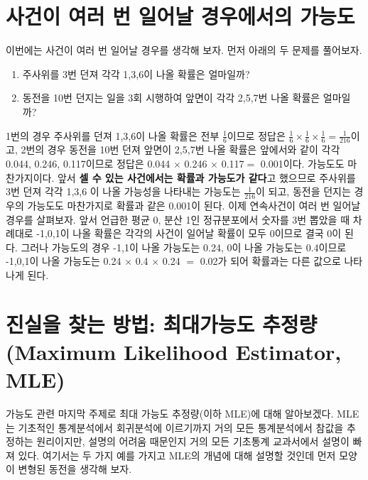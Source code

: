 \documentclass[]{book}
\providecommand{\tightlist}{%
  \setlength{\itemsep}{0pt}\setlength{\parskip}{0pt}}
\begin{document}
\section{사건이 여러 번 일어날 경우에서의
가능도}\label{uxc0acuxac74uxc774-uxc5ecuxb7ec-uxbc88-uxc77cuxc5b4uxb0a0-uxacbduxc6b0uxc5d0uxc11cuxc758-uxac00uxb2a5uxb3c4}

이번에는 사건이 여러 번 일어날 경우를 생각해 보자. 먼저 아래의 두 문제를
풀어보자.

\begin{enumerate}
\def\labelenumi{\arabic{enumi}.}
\tightlist
\item
  주사위를 3번 던져 각각 1,3,6이 나올 확률은 얼마일까?
\item
  동전을 10번 던지는 일을 3회 시행하여 앞면이 각각 2,5,7번 나올 확률은
  얼마일까?
\end{enumerate}

1번의 경우 주사위를 던져 1,3,6이 나올 확률은 전부 \(\frac{1}{6}\)이므로
정답은
\(\frac{1}{6}\times\frac{1}{6}\times\frac{1}{6}=\frac{1}{216}\)이고,
2번의 경우 동전을 10번 던져 앞면이 2,5,7번 나올 확률은 앞에서와 같이
각각 0.044, 0.246, 0.117이므로 정답은 0.044 \(\times\) 0.246 \(\times\)
0.117\(=\) 0.001이다. 가능도도 마찬가지이다. 앞서 \textbf{셀 수 있는
사건에서는 확률과 가능도가 같다}고 했으므로 주사위를 3번 던져 각각 1,3,6
이 나올 가능성을 나타내는 가능도는 \(\frac{1}{216}\)이 되고, 동전을
던지는 경우의 가능도도 마찬가지로 확률과 같은 0.001이 된다. 이제
연속사건이 여러 번 일어날 경우를 살펴보자. 앞서 언급한 평균 0, 분산 1인
정규분포에서 숫자를 3번 뽑았을 때 차례대로 -1,0,1이 나올 확률은 각각의
사건이 일어날 확률이 모두 0이므로 결국 0이 된다. 그러나 가능도의 경우
-1,1이 나올 가능도는 0.24, 0이 나올 가능도는 0.4이므로 -1,0,1이 나올
가능도는 0.24 \(\times\) 0.4 \(\times\) 0.24 \(=\) 0.02가 되어 확률과는
다른 값으로 나타나게 된다.

\section{진실을 찾는 방법: 최대가능도 추정량(Maximum Likelihood
Estimator,
MLE)}\label{uxc9c4uxc2e4uxc744-uxcc3euxb294-uxbc29uxbc95-uxcd5cuxb300uxac00uxb2a5uxb3c4-uxcd94uxc815uxb7c9maximum-likelihood-estimator-mle}

가능도 관련 마지막 주제로 최대 가능도 추정량(이하 MLE)에 대해
알아보겠다. MLE는 기초적인 통계분석에서 회귀분석에 이르기까지 거의 모든
통계분석에서 참값을 추정하는 원리이지만, 설명의 어려움 때문인지 거의
모든 기초통계 교과서에서 설명이 빠져 있다. 여기서는 두 가지 예를 가지고
MLE의 개념에 대해 설명할 것인데 먼저 모양이 변형된 동전을 생각해 보자.
\end{document}
